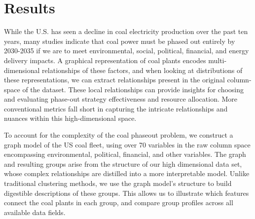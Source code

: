 \section{Results}

While the U.S. has seen a decline in coal electricity production over the past ten years, many studies indicate that coal power must be phased out entirely 
by 2030-2035 if we are to meet environmental, social, political, financial, and energy delivery impacts. A graphical representation of coal plants encodes 
multi-dimensional relationships of these factors, and when looking at distributions of these representations, we can extract relationships present in the original 
column-space of the dataset. These local relationships can provide insights for choosing and evaluating phase-out strategy effectiveness and resource allocation. 
More conventional metrics fall short in capturing the intricate relationships and nuances within this high-dimensional space.

To account for the complexity of the coal phaseout problem, we construct a graph model of the US coal fleet, using over 70 variables in the raw column space 
encompassing environmental, political, financial, and other variables. The graph and resulting groups arise from the structure of our high dimensional data set, 
whose complex relationships are distilled into a more interpretable model. Unlike traditional clustering methods, we use the graph model’s structure to build 
digestible descriptions of these groups. This allows us to illustrate which features connect the coal plants in each group, and compare group profiles across all 
available data fields.

\vspace{\baselineskip}



